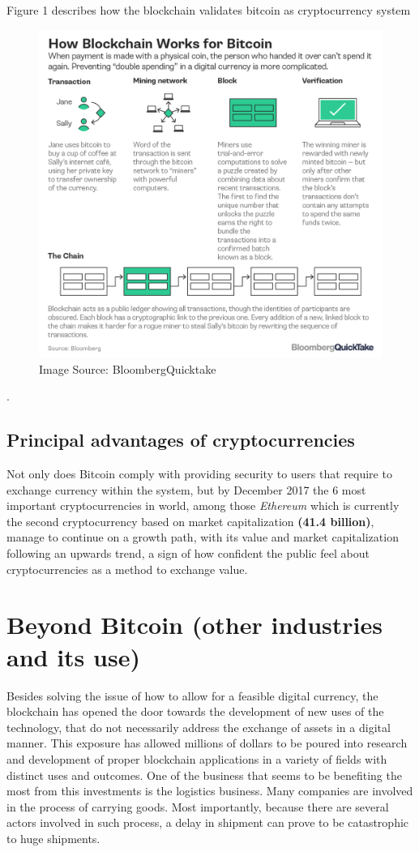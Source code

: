 \documentclass[submission,copyright,creativecommons]{eptcs}
\begin{document}
Figure 1 describes how the blockchain validates bitcoin as cryptocurrency system\cite{noauthor_bitcoin}
\begin{figure}[h]
    \centering
    \label{fig:my_label}
    \includegraphics[width=5in]{bitcoin-blockchain-bloomberg}
     \caption{Image Source: BloombergQuicktake}
\end{figure}.

\subsection{Principal advantages of cryptocurrencies}
Not only does Bitcoin comply with providing security to users that require to exchange currency within the system, but by December 2017\cite{MostImportantCryptocurrencies} the 6 most important cryptocurrencies in world, among those \textit{Ethereum} which is currently the second cryptocurrency based on market capitalization \textbf{(41.4 billion)}, manage to continue on a growth path, with its value and market capitalization following an upwards trend, a sign of how confident the public feel about cryptocurrencies as a method to exchange value.

\section{Beyond Bitcoin (other industries and its use)}
Besides solving the issue of how to allow for a feasible digital currency, the blockchain has opened the door towards the development of new uses of the technology, that do not necessarily address the exchange of assets in a digital manner.  This exposure has allowed millions of dollars to be poured into research and development of proper blockchain applications in a variety of fields with distinct uses and outcomes.
One of the business that seems to be benefiting the most from this investments is the logistics business. Many companies are involved in the process of carrying goods. Most importantly, because there are several actors involved in such process, a delay in shipment can prove to be catastrophic to huge shipments.  
\end{document}
